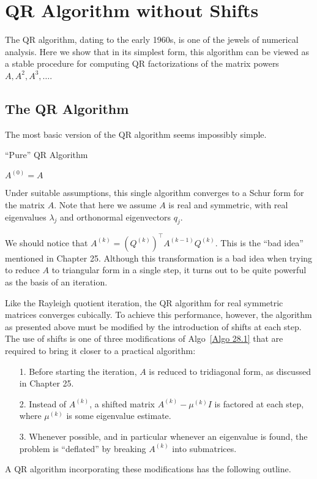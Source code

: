 \chapter{QR Algorithm without Shifts}
The QR algorithm, dating to the early 1960s, is one of the jewels of numerical analysis. Here we show that in its simplest form, this algorithm can be viewed as a stable procedure for computing QR factorizations of the matrix powers $A, A^{2}, A^{3},\ldots $. 

\section{The QR Algorithm}
The most basic version of the QR algorithm seems impossibly simple.  

\begin{algorithm}[H]
    \caption{``Pure'' QR Algorithm}
    \label{Algo 28.1}
    $ A^{(0)}=A $\; 
\end{algorithm}
Under suitable assumptions, this single algorithm converges to a Schur form for the matrix $A$. Note that here we assume $A$ is real and symmetric, with real eigenvalues $\lambda _j$ and orthonormal eigenvectors $ q_j $.  

We should notice that $A^{(k)} = (Q^{(k)})^\top  A^{(k-1)}Q^{(k)}$. This is the ``bad idea'' mentioned in Chapter 25.  Although this transformation is a bad idea when trying to reduce $A$ to triangular form in a single step, it turns out to be quite powerful as the basis of an iteration.  

Like the Rayleigh quotient iteration, the QR algorithm for real symmetric matrices converges cubically. To achieve this performance, however, the algorithm as presented above must be modified by the introduction of shifts at each step. The use of shifts is one of three modifications of Algo~\ref{Algo 28.1} that are required to bring it closer to a practical algorithm: 

\begin{itemize}
    \item [1.] Before starting the iteration, $ A $ is reduced to tridiagonal form, as discussed in Chapter 25. 
    \item [2.] Instead of $A^{(k)}$, a shifted matrix $A^{(k)}- \mu ^{(k)}I$ is factored at each step, where $\mu^{(k)}$ is some eigenvalue estimate. 
    \item [3.] Whenever possible, and in particular whenever an eigenvalue is found, the problem is ``deflated'' by breaking $A^{(k)}$ into submatrices. 
\end{itemize}
A QR algorithm incorporating these modifications has the following outline. 

